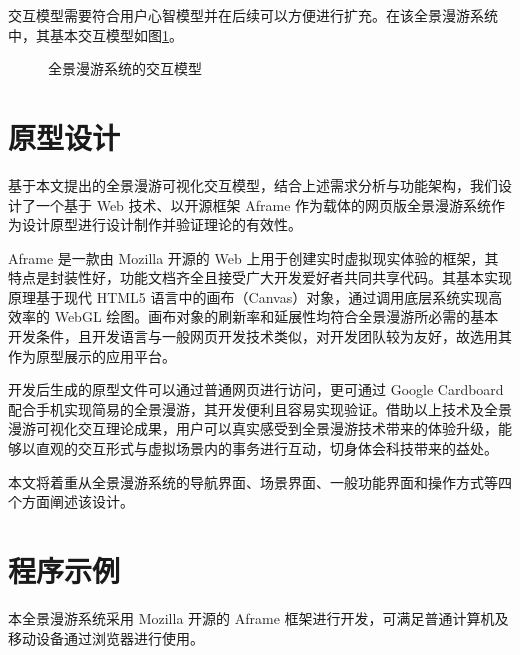 交互模型需要符合用户心智模型并在后续可以方便进行扩充。在该全景漫游系统中，其基本交互模型如图\ref{fig:scene}。

\begin{figure}[htp]
\centering
{}
\caption{全景漫游系统的交互模型}
\label{fig:scene}
\end{figure}

\section{原型设计}
基于本文提出的全景漫游可视化交互模型，结合上述需求分析与功能架构，我们设计了一个基于 Web 技术、以开源框架 Aframe 作为载体的网页版全景漫游系统作为设计原型进行设计制作并验证理论的有效性。

Aframe 是一款由 Mozilla 开源的 Web 上用于创建实时虚拟现实体验的框架，其特点是封装性好，功能文档齐全且接受广大开发爱好者共同共享代码。其基本实现原理基于现代 HTML5 语言中的画布（Canvas）对象，通过调用底层系统实现高效率的 WebGL 绘图。画布对象的刷新率和延展性均符合全景漫游所必需的基本开发条件，且开发语言与一般网页开发技术类似，对开发团队较为友好，故选用其作为原型展示的应用平台。

开发后生成的原型文件可以通过普通网页进行访问，更可通过 Google Cardboard 配合手机实现简易的全景漫游，其开发便利且容易实现验证。借助以上技术及全景漫游可视化交互理论成果，用户可以真实感受到全景漫游技术带来的体验升级，能够以直观的交互形式与虚拟场景内的事务进行互动，切身体会科技带来的益处。

本文将着重从全景漫游系统的导航界面、场景界面、一般功能界面和操作方式等四个方面阐述该设计。


\section{程序示例}
本全景漫游系统采用 Mozilla 开源的 Aframe 框架进行开发，可满足普通计算机及移动设备通过浏览器进行使用。


